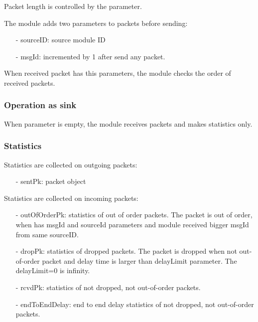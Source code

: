 Packet length is controlled by the  parameter.

The module adds two parameters to packets before sending:
\begin{itemize}
\item[-] sourceID: source module ID
\item[-] msgId: incremented by 1 after send any packet.
\end{itemize}
When received packet has this parameters, the module checks the order of received packets.

\subsubsection*{Operation as sink}

When  parameter is empty, the module receives packets and makes statistics only.

\subsubsection*{Statistics}

Statistics are collected on outgoing packets:
\begin{itemize}
\item[-] sentPk: packet object
\end{itemize}

Statistics are collected on incoming packets:
\begin{itemize}
\item[-] outOfOrderPk: statistics of out of order packets.
       The packet is out of order, when has msgId and sourceId parameters and module
       received bigger msgId from same sourceID.
\item[-] dropPk: statistics of dropped packets. 
       The packet is dropped when not out-of-order packet and delay time is larger than
       delayLimit parameter. The delayLimit=0 is infinity.
\item[-] rcvdPk: statistics of not dropped, not out-of-order packets.
\item[-] endToEndDelay: end to end delay statistics of not dropped, not out-of-order packets.
\end{itemize}


